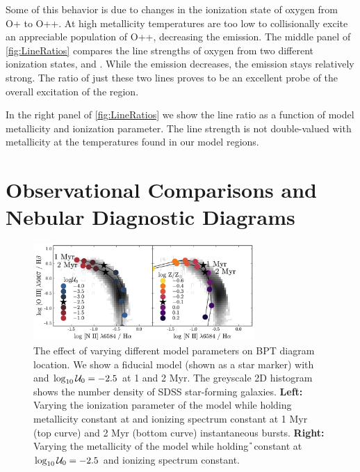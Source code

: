Some of this behavior is due to changes in the ionization state of oxygen from O+ to O++. At high metallicity temperatures are too low to collisionally excite an appreciable population of O++, decreasing the \oiii{} emission. The middle panel of \ref{fig:LineRatios} compares the line strengths of oxygen from two different ionization states, \oiii{} and \oii{}. While the \oiii{} emission decreases, the \oii{} emission stays relatively strong. The ratio of just these two lines proves to be an excellent probe of the overall excitation of the \hii region.

In the right panel of \ref{fig:LineRatios} we show the \niiha{} line ratio as a function of model metallicity and ionization parameter. The \nii{} line strength is not double-valued with metallicity at the temperatures found in our model \hii regions.

\section{Observational Comparisons and Nebular Diagnostic Diagrams} \label{sec:models:diagnostics}

\begin{figure}[!htbp]
    \begin{centering}
        \includegraphics[width=0.75\textwidth]{manuscript/chapter2/f16.pdf}
        \caption{The effect of varying different model parameters on BPT diagram location. We show a fiducial model (shown as a star marker) with  and $\log_{10} \mathcal{U}_0 = -2.5$ at 1 and 2 Myr. The greyscale 2D histogram shows the number density of SDSS star-forming galaxies. \textbf{Left:} Varying the ionization parameter of the model while holding metallicity constant at  and ionizing spectrum constant at 1 Myr (top curve) and 2 Myr (bottom curve) instantaneous bursts. \textbf{Right:} Varying the metallicity of the model while holding \U{} constant at $\log_{10} \mathcal{U}_0 = -2.5$ and ionizing spectrum constant.}
        \label{fig:BPTintro}
    \end{centering}
\end{figure}


